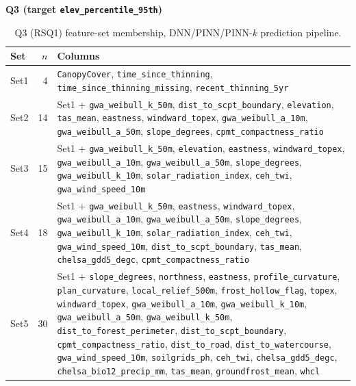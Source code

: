\documentclass[logo,msc,ai]{infthesis}           %
\begin{document}
\begin{table}[H]
\centering
\textbf{Q3 (target \texttt{elev\_percentile\_95th})}\\[4pt]
\scriptsize
\renewcommand{\arraystretch}{1.1}
\begin{tabularx}{\linewidth}{@{} l r >{\raggedright\arraybackslash}X @{}}
\toprule
Set & $n$ & Columns \\
\midrule
Set1 & 4 & \texttt{CanopyCover}, \texttt{time\_since\_thinning}, \texttt{time\_since\_thinning\_missing}, \texttt{recent\_thinning\_5yr} \\
Set2 & 14 & Set1 + \texttt{gwa\_weibull\_k\_50m}, \texttt{dist\_to\_scpt\_boundary}, \texttt{elevation}, \texttt{tas\_mean}, \texttt{eastness}, \texttt{windward\_topex}, \texttt{gwa\_weibull\_a\_10m}, \texttt{gwa\_weibull\_a\_50m}, \texttt{slope\_degrees}, \texttt{cpmt\_compactness\_ratio} \\
Set3 & 15 & Set1 + \texttt{gwa\_weibull\_k\_50m}, \texttt{elevation}, \texttt{eastness}, \texttt{windward\_topex}, \texttt{gwa\_weibull\_a\_10m}, \texttt{gwa\_weibull\_a\_50m}, \texttt{slope\_degrees}, \texttt{gwa\_weibull\_k\_10m}, \texttt{solar\_radiation\_index}, \texttt{ceh\_twi}, \texttt{gwa\_wind\_speed\_10m} \\
Set4 & 18 & Set1 + \texttt{gwa\_weibull\_k\_50m}, \texttt{eastness}, \texttt{windward\_topex}, \texttt{gwa\_weibull\_a\_10m}, \texttt{gwa\_weibull\_a\_50m}, \texttt{slope\_degrees}, \texttt{gwa\_weibull\_k\_10m}, \texttt{solar\_radiation\_index}, \texttt{ceh\_twi}, \texttt{gwa\_wind\_speed\_10m}, \texttt{dist\_to\_scpt\_boundary}, \texttt{tas\_mean}, \texttt{chelsa\_gdd5\_degc}, \texttt{cpmt\_compactness\_ratio} \\
Set5 & 30 & Set1 + \texttt{slope\_degrees}, \texttt{northness}, \texttt{eastness}, \texttt{profile\_curvature}, \texttt{plan\_curvature}, \texttt{local\_relief\_500m}, \texttt{frost\_hollow\_flag}, \texttt{topex}, \texttt{windward\_topex}, \texttt{gwa\_weibull\_a\_10m}, \texttt{gwa\_weibull\_k\_10m}, \texttt{gwa\_weibull\_a\_50m}, \texttt{gwa\_weibull\_k\_50m}, \texttt{dist\_to\_forest\_perimeter}, \texttt{dist\_to\_scpt\_boundary}, \texttt{cpmt\_compactness\_ratio}, \texttt{dist\_to\_road}, \texttt{dist\_to\_watercourse}, \texttt{gwa\_wind\_speed\_10m}, \texttt{soilgrids\_ph}, \texttt{ceh\_twi}, \texttt{chelsa\_gdd5\_degc}, \texttt{chelsa\_bio12\_precip\_mm}, \texttt{tas\_mean}, \texttt{groundfrost\_mean}, \texttt{whcl} \\
\bottomrule
\end{tabularx}
\caption{\small{Q3 (RSQ1) feature-set membership, DNN/PINN/PINN-$k$ prediction pipeline.}}
\label{tab:feature-sets-q3}
\end{table}
\end{document}
